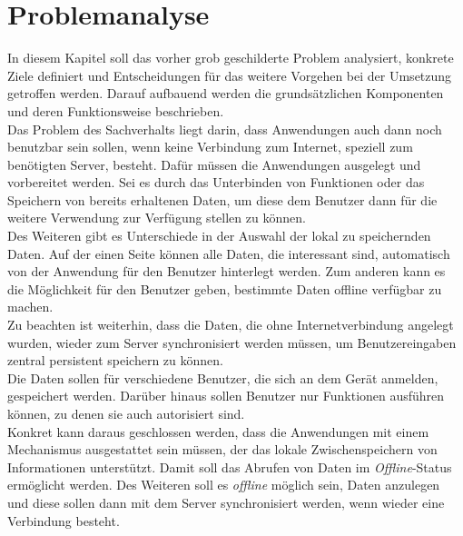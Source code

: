 \chapter{Problemanalyse}
\label{cha:problemanalyse}
In diesem Kapitel soll das vorher grob geschilderte Problem analysiert, konkrete Ziele definiert und Entscheidungen für das weitere Vorgehen bei der Umsetzung getroffen werden. Darauf aufbauend werden die grundsätzlichen Komponenten und deren Funktionsweise beschrieben.\\

Das Problem des Sachverhalts liegt darin, dass Anwendungen auch dann noch benutzbar sein sollen, wenn keine Verbindung zum Internet, speziell zum benötigten Server, besteht. Dafür müssen die Anwendungen ausgelegt und vorbereitet werden. Sei es durch das Unterbinden von Funktionen oder das Speichern von bereits erhaltenen Daten, um diese dem Benutzer dann für die weitere Verwendung zur Verfügung stellen zu können. \\
Des Weiteren gibt es Unterschiede in der Auswahl der lokal zu speichernden Daten. Auf der einen Seite können alle Daten, die interessant sind, automatisch von der Anwendung für den Benutzer hinterlegt werden. Zum anderen kann es die Möglichkeit für den Benutzer geben, bestimmte Daten offline verfügbar zu machen.\\
Zu beachten ist weiterhin, dass die Daten, die ohne Internetverbindung angelegt wurden, wieder zum Server synchronisiert werden müssen, um Benutzereingaben zentral persistent speichern zu können.\\
Die Daten sollen für verschiedene Benutzer, die sich an dem Gerät anmelden, gespeichert werden. Darüber hinaus sollen Benutzer nur Funktionen ausführen können, zu denen sie auch autorisiert sind.\\

Konkret kann daraus geschlossen werden, dass die Anwendungen mit einem Mechanismus ausgestattet sein müssen, der das lokale Zwischenspeichern von Informationen unterstützt. Damit soll das Abrufen von Daten im \textit{Offline}-Status ermöglicht werden. Des Weiteren soll es \textit{offline} möglich sein, Daten anzulegen und diese sollen dann mit dem Server synchronisiert werden, wenn wieder eine Verbindung besteht.\\

